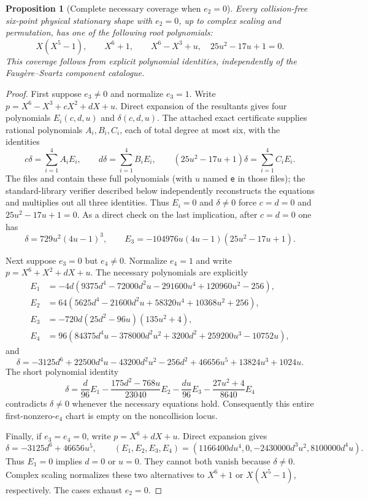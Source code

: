 \documentclass[11pt]{article}
\newtheorem{proposition}[theorem]{Proposition}
\theoremstyle{remark}
\numberwithin{equation}{section}
\begin{document}
\begin{proposition}[Complete necessary coverage when $e_2=0$]
\label{prop:six-e2-zero-independent}
Every collision-free six-point physical stationary shape with $e_2=0$,
up to complex scaling and permutation, has one of the following root
polynomials:
\[
 X(X^5-1),\qquad X^6+1,\qquad
 X^6-X^3+u,\quad 25u^2-17u+1=0.
\]
This coverage follows from explicit polynomial identities, independently
of the Faug\`ere--Svartz component catalogue.
\end{proposition}
\begin{proof}
First suppose $e_3\ne0$ and normalize $e_3=1$. Write
$p=X^6-X^3+cX^2+dX+u$. Direct expansion of the resultants gives four
polynomials $E_i(c,d,u)$ and $\delta(c,d,u)$. The attached exact
certificate supplies rational polynomials $A_i,B_i,C_i$, each of total
degree at most six, with the identities
\begin{equation}\label{eq:six-b1-combinations}
 c\delta=\sum_{i=1}^4 A_iE_i,\qquad
 d\delta=\sum_{i=1}^4 B_iE_i,\qquad
 (25u^2-17u+1)\delta=\sum_{i=1}^4 C_iE_i.
\end{equation}
The files  and
 contain these full
polynomials (with $u$ named \texttt{e} in those files); the
standard-library verifier described below independently
reconstructs the equations and multiplies out all three identities.
Thus $E_i=0$ and $\delta\ne0$ force $c=d=0$ and
$25u^2-17u+1=0$. As a direct check on the last implication, after
$c=d=0$ one has
\[
 \delta=729u^2(4u-1)^3,\qquad
 E_3=-104976u(4u-1)(25u^2-17u+1).
\]

Next suppose $e_3=0$ but $e_4\ne0$. Normalize $e_4=1$ and write
$p=X^6+X^2+dX+u$. The necessary polynomials are explicitly
\begin{align*}
 E_1&=-4d(9375d^4-72000d^2u-291600u^4+120960u^2-256),\\
 E_2&=64(5625d^4-21600d^2u+58320u^4+10368u^2+256),\\
 E_3&=-720d(25d^2-96u)(135u^2+4),\\
 E_4&=96(84375d^4u-378000d^2u^2+3200d^2+259200u^3-10752u),
\end{align*}
and
\[
 \delta=-3125d^6+22500d^4u-43200d^2u^2-256d^2
        +46656u^5+13824u^3+1024u.
\]
The short polynomial identity
\begin{equation}\label{eq:six-e4-collision-identity}
 \delta=\frac d{96}E_1
 -\frac{175d^2-768u}{23040}E_2
 -\frac{du}{96}E_3-\frac{27u^2+4}{8640}E_4
\end{equation}
contradicts $\delta\ne0$ whenever the necessary equations hold.
Consequently this entire first-nonzero-$e_4$ chart is empty on the
noncollision locus.

Finally, if $e_3=e_4=0$, write $p=X^6+dX+u$. Direct expansion gives
\[
 \delta=-3125d^6+46656u^5,\qquad
 (E_1,E_2,E_3,E_4)
 =(1166400du^4,0,-2430000d^3u^2,8100000d^4u).
\]
Thus $E_1=0$ implies $d=0$ or $u=0$. They cannot both vanish because
$\delta\ne0$. Complex scaling normalizes these two alternatives to
$X^6+1$ or $X(X^5-1)$, respectively. The cases exhaust $e_2=0$.
\end{proof}
\end{document}
